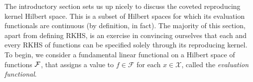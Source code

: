 The introductory section sets us up nicely to discuss the coveted reproducing kernel Hilbert space.
This is a subset of Hilbert spaces for which its evaluation functionals are continuous (by definition, in fact).
The majority of this section, apart from defining RKHS, is an exercise in convincing ourselves that each and every RKHS of functions can be specified solely through its reproducing kernel.
To begin, we consider a fundamental linear functional on a Hilbert space of functions ${\mathcal F}$, that assigns a value to $f \in \mathcal F$ for each $x \in \mathcal X$, called the \emph{evaluation functional}.



